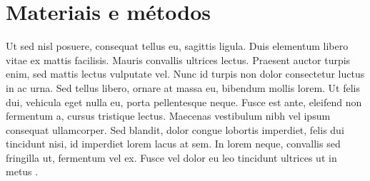 \section{Materiais e métodos}
Ut sed nisl posuere, consequat tellus eu, sagittis ligula. Duis elementum libero vitae ex mattis facilisis. Mauris convallis ultrices lectus. Praesent auctor turpis enim, sed mattis lectus vulputate vel. Nunc id turpis non dolor consectetur luctus in ac urna. Sed tellus libero, ornare at massa eu, bibendum mollis lorem. Ut felis dui, vehicula eget nulla eu, porta pellentesque neque. Fusce est ante, eleifend non fermentum a, cursus tristique lectus. Maecenas vestibulum nibh vel ipsum consequat ullamcorper. Sed blandit, dolor congue lobortis imperdiet, felis dui tincidunt nisi, id imperdiet lorem lacus at sem. In lorem neque, convallis sed fringilla ut, fermentum vel ex. Fusce vel dolor eu leo tincidunt ultrices ut in metus \cites{dummy2024book}{dummy2024conference}.